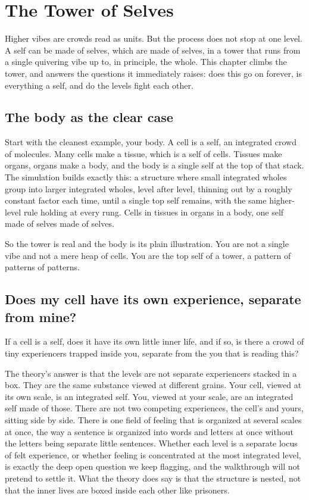 \section{The Tower of Selves}

Higher vibes are crowds read as units. But the process does not stop at one level. A self can be made of selves, which are made of selves, in a tower that runs from a single quivering vibe up to, in principle, the whole. This chapter climbs the tower, and answers the questions it immediately raises: does this go on forever, is everything a self, and do the levels fight each other.

\subsection{The body as the clear case}

Start with the cleanest example, your body. A cell is a self, an integrated crowd of molecules. Many cells make a tissue, which is a self of cells. Tissues make organs, organs make a body, and the body is a single self at the top of that stack. The simulation builds exactly this: a structure where small integrated wholes group into larger integrated wholes, level after level, thinning out by a roughly constant factor each time, until a single top self remains, with the same higher-level rule holding at every rung. Cells in tissues in organs in a body, one self made of selves made of selves.

So the tower is real and the body is its plain illustration. You are not a single vibe and not a mere heap of cells. You are the top self of a tower, a pattern of patterns of patterns.

\subsection{Does my cell have its own experience, separate from mine?}

If a cell is a self, does it have its own little inner life, and if so, is there a crowd of tiny experiencers trapped inside you, separate from the you that is reading this?

The theory's answer is that the levels are not separate experiencers stacked in a box. They are the same substance viewed at different grains. Your cell, viewed at its own scale, is an integrated self. You, viewed at your scale, are an integrated self made of those. There are not two competing experiences, the cell's and yours, sitting side by side. There is one field of feeling that is organized at several scales at once, the way a sentence is organized into words and letters at once without the letters being separate little sentences. Whether each level is a separate locus of felt experience, or whether feeling is concentrated at the most integrated level, is exactly the deep open question we keep flagging, and the walkthrough will not pretend to settle it. What the theory does say is that the structure is nested, not that the inner lives are boxed inside each other like prisoners.

